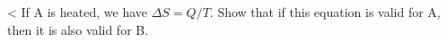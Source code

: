 <%
If A is heated, we have $\Delta S=Q/T$. Show that if this equation is valid for A, then
it is also valid for B.

